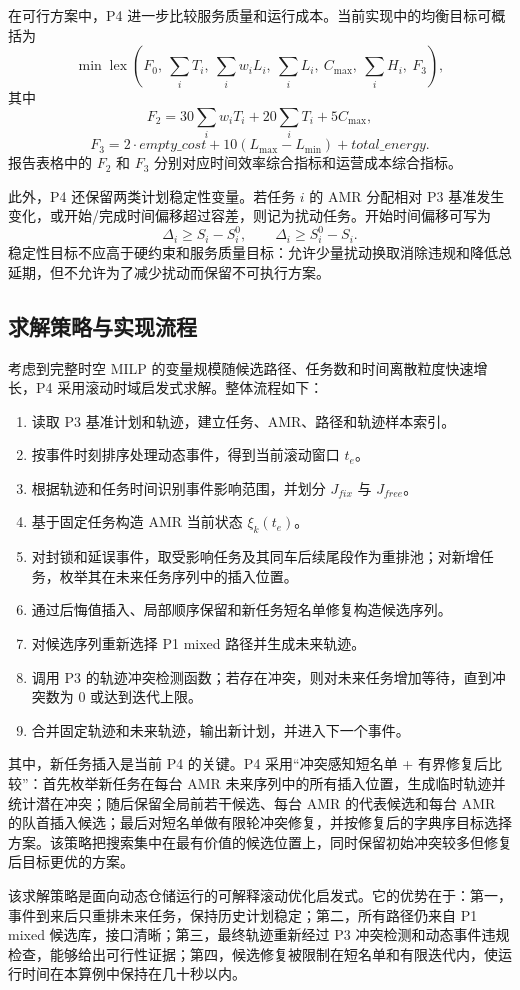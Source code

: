 在可行方案中，P4 进一步比较服务质量和运行成本。当前实现中的均衡目标可概括为
\[
\min \operatorname{lex}
\left(
F_0,\ 
\sum_i T_i,\ 
\sum_i w_iL_i,\ 
\sum_i L_i,\ 
C_{\max},\
\sum_i H_i,\ 
F_3
\right),
\]
其中
\[
F_2=30\sum_iw_iT_i+20\sum_iT_i+5C_{\max},
\]
\[
F_3=2\cdot empty\_cost+10(L_{\max}-L_{\min})+total\_energy.
\]
报告表格中的 $F_2$ 和 $F_3$ 分别对应时间效率综合指标和运营成本综合指标。

此外，P4 还保留两类计划稳定性变量。若任务 $i$ 的 AMR 分配相对 P3 基准发生变化，或开始/完成时间偏移超过容差，则记为扰动任务。开始时间偏移可写为
\[
\Delta_i\ge S_i-S_i^0,\qquad
\Delta_i\ge S_i^0-S_i.
\]
稳定性目标不应高于硬约束和服务质量目标：允许少量扰动换取消除违规和降低总延期，但不允许为了减少扰动而保留不可执行方案。

\subsection{求解策略与实现流程}

考虑到完整时空 MILP 的变量规模随候选路径、任务数和时间离散粒度快速增长，P4 采用滚动时域启发式求解。整体流程如下：

\begin{enumerate}
  \item 读取 P3 基准计划和轨迹，建立任务、AMR、路径和轨迹样本索引。
  \item 按事件时刻排序处理动态事件，得到当前滚动窗口 $t_e$。
  \item 根据轨迹和任务时间识别事件影响范围，并划分 $J_{fix}$ 与 $J_{free}$。
  \item 基于固定任务构造 AMR 当前状态 $\xi_k(t_e)$。
  \item 对封锁和延误事件，取受影响任务及其同车后续尾段作为重排池；对新增任务，枚举其在未来任务序列中的插入位置。
  \item 通过后悔值插入、局部顺序保留和新任务短名单修复构造候选序列。
  \item 对候选序列重新选择 P1 mixed 路径并生成未来轨迹。
  \item 调用 P3 的轨迹冲突检测函数；若存在冲突，则对未来任务增加等待，直到冲突数为 0 或达到迭代上限。
  \item 合并固定轨迹和未来轨迹，输出新计划，并进入下一个事件。
\end{enumerate}

其中，新任务插入是当前 P4 的关键。P4 采用“冲突感知短名单 + 有界修复后比较”：首先枚举新任务在每台 AMR 未来序列中的所有插入位置，生成临时轨迹并统计潜在冲突；随后保留全局前若干候选、每台 AMR 的代表候选和每台 AMR 的队首插入候选；最后对短名单做有限轮冲突修复，并按修复后的字典序目标选择方案。该策略把搜索集中在最有价值的候选位置上，同时保留初始冲突较多但修复后目标更优的方案。

该求解策略是面向动态仓储运行的可解释滚动优化启发式。它的优势在于：第一，事件到来后只重排未来任务，保持历史计划稳定；第二，所有路径仍来自 P1 mixed 候选库，接口清晰；第三，最终轨迹重新经过 P3 冲突检测和动态事件违规检查，能够给出可行性证据；第四，候选修复被限制在短名单和有限迭代内，使运行时间在本算例中保持在几十秒以内。
